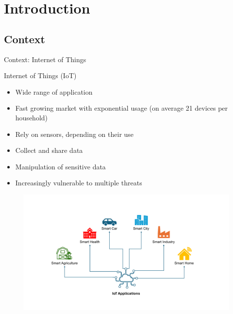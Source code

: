 \section*{Introduction}

\subsection{Context}
\begin{frame}{Context: Internet of Things}
    \begin{minipage}[c]{0.5\textwidth}
        \begin{block}{Internet of Things (IoT)}
            \begin{itemize}
                [square]
                \justifying
                \item Wide range of application
                \item Fast growing market with exponential usage (on average 21 devices per household)
                \item Rely on sensors, depending on their use
                \item Collect and share data
                \item Manipulation of sensitive data
                \item Increasingly vulnerable to multiple threats
            \end{itemize}
        \end{block}
    \end{minipage}\hfill%
    \begin{minipage}[c]{0.5\textwidth}
        \begin{figure}
            \centering
            \includegraphics[width=.78\textwidth, trim={4.5cm 2.25cm 5.75cm 3.25cm}, clip]{src/1_introduction/img/iotapplications.pdf}

\end{figure}
\end{minipage}
\end{frame}
